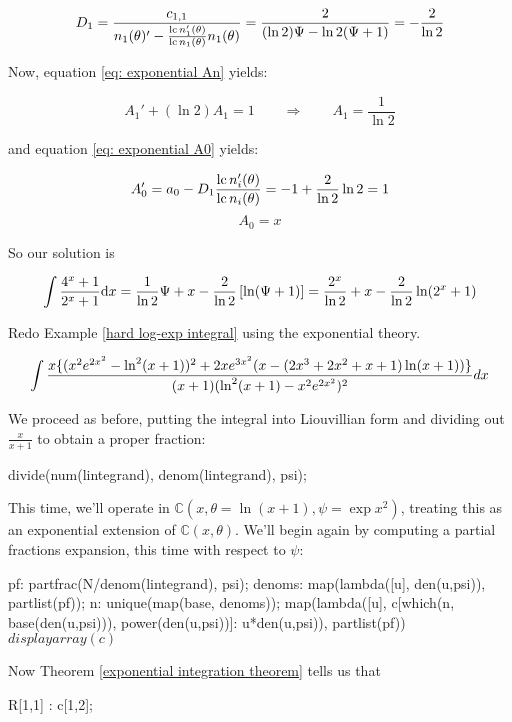 $$ D_1 = \frac{c_{1,1}}{n_1(\theta)' - \frac{{\rm lc\,} n_1'(\theta)}{{\rm lc\,} n_1(\theta)} n_1(\theta)} = \frac{2}{(\ln 2) \Psi - \ln 2 (\Psi +1 )} = -\frac{2}{\ln 2}$$

Now, equation \eqref{eq: exponential An} yields:

$$A_1' + (\ln 2) A_1 = 1 \qquad\Longrightarrow\qquad A_1 = \frac{1}{\ln 2}$$

and equation \eqref{eq: exponential A0} yields:

$$A_0' = a_0 - D_1 \frac{{\rm lc\,} n_i'(\theta)}{{\rm lc\,} n_i(\theta)} = -1 + \frac{2}{\ln 2} \ln 2 = 1$$
$$A_0 = x$$

So our solution is

$$\int {{4^x+1}\over{2^x+1}} {\rm d}x = \frac{1}{\ln 2}\Psi + x  - \frac{2}{\ln 2}\left[\ln(\Psi+1)\right] =
\frac{2^x}{\ln 2} + x - \frac{2}{\ln 2}\ln(2^x+1) $$

\endexample

\vfill\eject

\example
Redo Example \ref{hard log-exp integral} using the exponential theory.

$$\int{{x\{(x^2e^{2x^2}-\ln^2(x+1))^2+2xe^{3x^2}(x-(2x^3+2x^2+x+1)\ln(x+1))\}}\over{(x+1)(\ln^2(x+1) - x^2e^{2x^2})^2}} dx$$

We proceed as before, putting the integral into Liouvillian form
and dividing out $\frac{x}{x+1}$ to obtain a proper fraction:

\begin{maximablock}
divide(num(lintegrand), denom(lintegrand), psi);
\end{maximablock}

This time, we'll operate in ${\mathbb C}(x,\theta = \ln (x+1),\psi = \exp x^2)$, treating
this as an exponential extension of ${\mathbb C}(x,\theta)$.  We'll begin again by
computing a partial fractions expansion, this time with respect to $\psi$:

\begin{maximablock}
pf: partfrac(N/denom(lintegrand), psi);
denoms: map(lambda([u], den(u,psi)),
            partlist(pf));
n: unique(map(base, denoms));
map(lambda([u],
       c[which(n, base(den(u,psi))),
         power(den(u,psi))]: u*den(u,psi)),
    partlist(pf))$
displayarray(c)$
\end{maximablock}

Now Theorem \ref{exponential integration theorem} tells us that

\begin{maximablock}
R[1,1] : c[1,2];
\end{maximablock}

